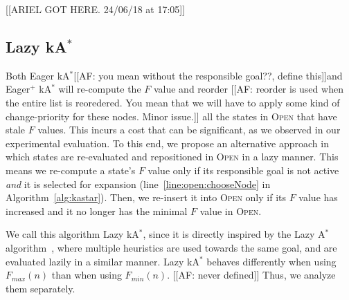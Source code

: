 \documentclass[twoside,11pt]{article}
\newcommand{\astar}{A$^*$\xspace}
\newcommand{\kastar}{kA$^*$\xspace}
\newcommand{\minf}{$F_{min}(n)$\xspace}
\newcommand{\maxf}{$F_{max}(n)$\xspace}
\newcommand{\open}{\textsc{Open}\xspace}
\newcommand{\roni}[1]{\textbf{[RS:#1]}}
\begin{document}


[[ARIEL GOT HERE. 24/06/18 at 17:05]]

\subsection{Lazy \kastar}


Both Eager \kastar [[AF: you mean without the responsible goal??, define this]]and Eager$^+$ \kastar will re-compute the $F$ value and reorder [[AF: reorder is used when the entire list is reoredered. You mean that we will have to apply some kind of change-priority for these nodes. Minor issue.]] all the states in \open that have stale $F$ values.
This incurs a cost that can be significant, as we observed in our experimental evaluation.
To this end, we propose an alternative approach in which states are re-evaluated and repositioned in \open in a lazy manner.
This means we re-compute a state's $F$ value only if its responsible goal is not active \emph{and} it is selected for expansion (line~\ref{line:open:chooseNode} in Algorithm~\ref{alg:kastar}).
Then, we re-insert it into \open only if its $F$ value has increased and it no longer has the minimal $F$ value in \open.


We call this algorithm Lazy \kastar, since it is directly inspired by the Lazy \astar algorithm~\cite{betzalel2015typeSystem,tolpin2013toward}, where multiple heuristics are used towards the same goal, and are evaluated lazily in a similar manner.
Lazy \kastar behaves differently when using \maxf than when using \minf. [[AF: never defined]]
Thus, we analyze them separately.
\end{document}
